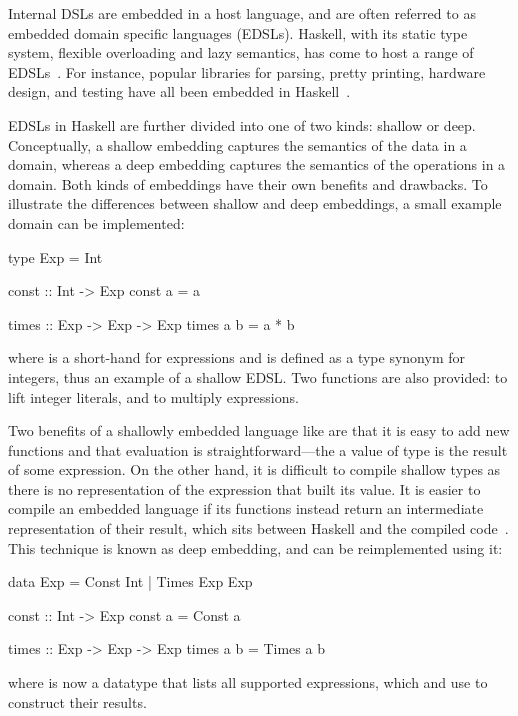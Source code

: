 \documentclass[../paper.tex]{subfiles}
\begin{document}
Internal DSLs are embedded in a host language, and are often referred to as embedded domain specific languages (EDSLs). Haskell, with its static type system, flexible overloading and lazy semantics, has come to host a range of EDSLs~\cite{elliott2003}. For instance, popular libraries for parsing, pretty printing, hardware design, and testing have all been embedded in Haskell~\cite{leijen2002, hughes1995, bjesse1998}.

EDSLs in Haskell are further divided into one of two kinds: shallow or deep. Conceptually, a shallow embedding captures the semantics of the data in a domain, whereas a deep embedding captures the semantics of the operations in a domain. Both kinds of embeddings have their own benefits and drawbacks. To illustrate the differences between shallow and deep embeddings, a small example domain can be implemented:

\begin{code}
type Exp = Int

const :: Int -> Exp
const a = a

times :: Exp -> Exp -> Exp
times a b = a * b
\end{code}

\noindent where  is a short-hand for expressions and is defined as a type synonym for integers, thus an example of a shallow EDSL. Two functions are also provided:  to lift integer literals, and  to multiply expressions.

Two benefits of a shallowly embedded language like  are that it is easy to add new functions and that evaluation is straightforward---the a value of type  is the result of some expression. On the other hand, it is difficult to compile shallow types as there is no representation of the expression that built its value. It is easier to compile an embedded language if its functions instead return an intermediate representation of their result, which sits between Haskell and the compiled code~\cite{elliott2003}. This technique is known as deep embedding, and  can be reimplemented using it:

\begin{code}
data Exp = Const Int | Times Exp Exp

const :: Int -> Exp
const a = Const a

times :: Exp -> Exp -> Exp
times a b = Times a b
\end{code}

\noindent where  is now a datatype that lists all supported expressions, which  and  use to construct their results.
\end{document}
